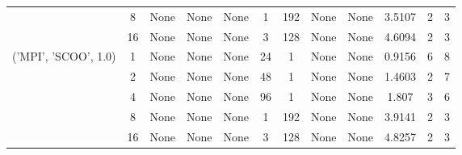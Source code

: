 \begin{tabular}{cccccccccccc}
& 8& None& None& None& 1& 192& None& None& 3.5107& 2& 3\\
& 16& None& None& None& 3& 128& None& None& 4.6094& 2& 3\\
\hline
\multirow{5}{*}{('MPI', 'SCOO', 1.0)}& 1& None& None& None& 24& 1& None& None& 0.9156& 6& 8\\
& 2& None& None& None& 48& 1& None& None& 1.4603& 2& 7\\
& 4& None& None& None& 96& 1& None& None& 1.807& 3& 6\\
& 8& None& None& None& 1& 192& None& None& 3.9141& 2& 3\\
& 16& None& None& None& 3& 128& None& None& 4.8257& 2& 3\\
\hline
\end{tabular}



